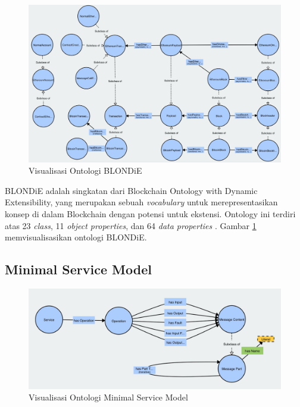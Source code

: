 \begin{figure}
  \centering
  \includegraphics[width=1\textwidth]{resources/chapter-2/blondie-visualization.jpg}
  \caption{Visualisasi Ontologi BLONDiE \parencite{third2017linked}}
  \label{image:blondie-visualization}
\end{figure}

BLONDiE adalah singkatan dari Blockchain Ontology with Dynamic Extensibility, yang merupakan sebuah \textit{vocabulary} untuk merepresentasikan konsep di dalam Blockchain dengan potensi untuk ekstensi. Ontology ini terdiri atas 23 \textit{class}, 11 \textit{object properties}, dan 64 \textit{data properties} \parencite{hector2020blondie}. Gambar \ref{image:blondie-visualization} memvisualisasikan ontologi BLONDiE.

\subsection{Minimal Service Model}
\label{subsec:minimal-service-model}

\begin{figure}
  \centering
  \includegraphics[width=1\textwidth]{resources/chapter-2/msm-visualization.jpg}
  \caption{Visualisasi Ontologi Minimal Service Model \parencite{third2017linked}}
  \label{image:msm-visualization}
\end{figure}

